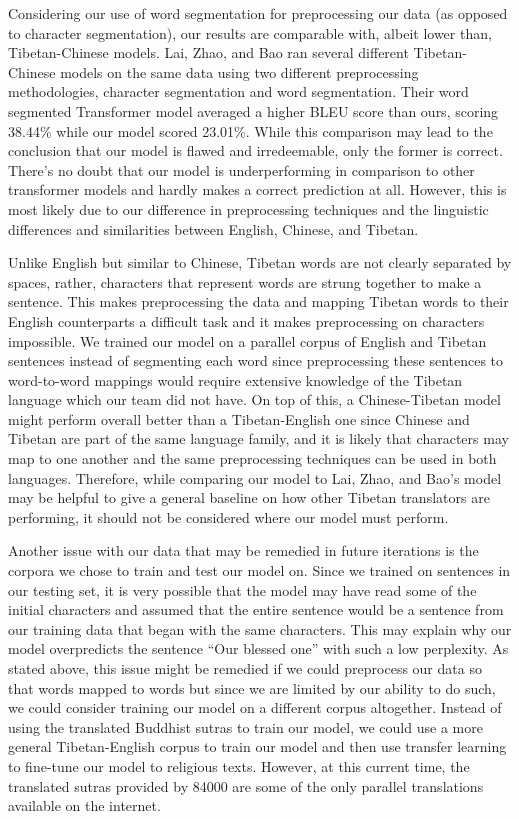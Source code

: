 \documentclass[letterpaper, 12 pt, conference]{ieeeconf}  %
\begin{document}
Considering our use of word segmentation for preprocessing our data (as opposed to character segmentation), our results are comparable with, albeit lower than, Tibetan-Chinese models. Lai, Zhao, and Bao ran several different Tibetan-Chinese models on the same data using two different preprocessing methodologies, character segmentation and word segmentation. Their word segmented Transformer model averaged a higher BLEU score than ours, scoring 38.44\% while our model scored 23.01\%. While this comparison may lead to the conclusion that our model is flawed and irredeemable, only the former is correct. There’s no doubt that our model is underperforming in comparison to other transformer models and hardly makes a correct prediction at all. However, this is most likely due to our difference in preprocessing techniques and the linguistic differences and similarities between English, Chinese, and Tibetan. 

Unlike English but similar to Chinese, Tibetan words are not clearly separated by spaces, rather, characters that represent words are strung together to make a sentence. This makes preprocessing the data and mapping Tibetan words to their English counterparts a difficult task and it makes preprocessing on characters impossible. We trained our model on a parallel corpus of English and Tibetan sentences instead of segmenting each word since preprocessing these sentences to word-to-word mappings would require extensive knowledge of the Tibetan language which our team did not have. On top of this, a Chinese-Tibetan model might perform overall better than a Tibetan-English one since Chinese and Tibetan are part of the same language family, and it is likely that characters may map to one another and the same preprocessing techniques can be used in both languages. Therefore, while comparing our model to Lai, Zhao, and Bao’s model may be helpful to give a general baseline on how other Tibetan translators are performing, it should not be considered where our model must perform.

Another issue with our data that may be remedied in future iterations is the corpora we chose to train and test our model on. Since we trained on sentences in our testing set, it is very possible that the model may have read some of the initial characters and assumed that the entire sentence would be a sentence from our training data that began with the same characters. This may explain why our model overpredicts the sentence “Our blessed one” with such a low perplexity. As stated above, this issue might be remedied if we could preprocess our data so that words mapped to words but since we are limited by our ability to do such, we could consider training our model on a different corpus altogether. Instead of using the translated Buddhist sutras to train our model, we could use a more general Tibetan-English corpus to train our model and then use transfer learning to fine-tune our model to religious texts. However, at this current time, the translated sutras provided by 84000 are some of the only parallel translations available on the internet. 
\end{document}
